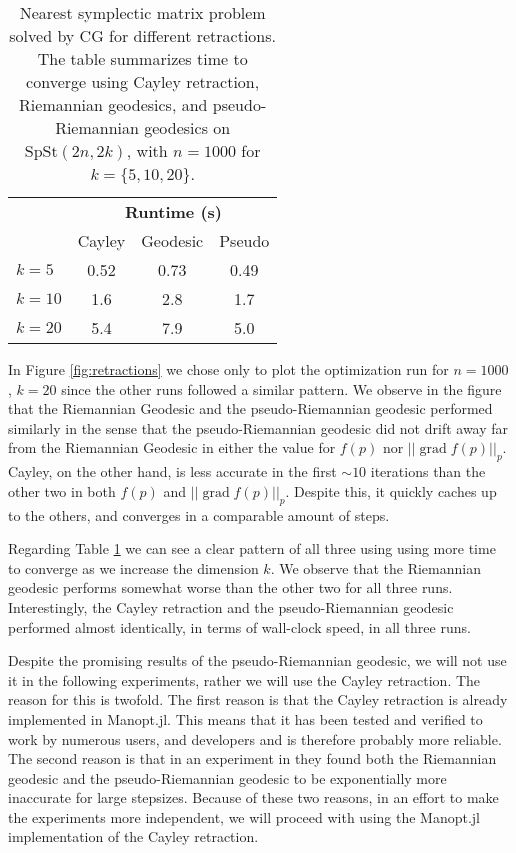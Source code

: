 \begin{table}
    \centering
    \caption[Retraction comparison timetable]{Nearest symplectic matrix problem solved by CG for different retractions. The table summarizes time to converge using Cayley retraction, Riemannian geodesics, and pseudo-Riemannian geodesics on $\mathrm{SpSt}(2n, 2k)$, with $n=1000$ for $k=\{5,10,20\}$. }\label{tab:exp1}
    \begin{tabular}{ l c c c }\label{tbl:Retraction_comparison}
        & \multicolumn{3}{c}{\textbf{Runtime (s)}} \\ 
        \cmidrule(l){2-4}
        & Cayley & Geodesic & Pseudo \\
        \midrule
        $k=5$ & 0.52 & 0.73 & 0.49 \\
        $k=10$ & 1.6 & 2.8 & 1.7 \\
        $k=20$ & 5.4 & 7.9 & 5.0
    \end{tabular}
\end{table}

In Figure \ref{fig:retractions} we chose only to plot the optimization run for $n=1000$, $k=20$ since the other runs followed a similar pattern. We observe in the figure that the Riemannian Geodesic and the pseudo-Riemannian geodesic performed similarly in the sense that the pseudo-Riemannian geodesic did not drift away far from the Riemannian Geodesic in either the value for $f(p)$ nor $\lvert \lvert \operatorname{grad}f(p) \rvert \rvert_{p}$. Cayley, on the other hand, is less accurate in the first $\sim10$ iterations than the other two in both  $f(p)$ and $\lvert \lvert \operatorname{grad}f(p) \rvert \rvert_{p}$. Despite this, it quickly caches up to the others, and converges in a comparable amount of steps. 

Regarding Table \ref{tbl:Retraction_comparison} we can see a clear pattern of all three using using more time to converge as we increase the dimension $k$. We observe that the Riemannian geodesic performs somewhat worse than the other two for all three runs. Interestingly, the Cayley retraction and the pseudo-Riemannian geodesic performed almost identically, in terms of wall-clock speed, in all three runs. 

Despite the promising results of the pseudo-Riemannian geodesic, we will not use it in the following experiments, rather we will use the Cayley retraction. The reason for this is twofold. The first reason is that the Cayley retraction is already implemented in Manopt.jl. This means that it has been tested and verified to work by numerous users, and developers and is therefore probably more reliable. The second reason is that in an experiment in \cite[p.~26]{BendokatZimmermann2021} they found both the Riemannian geodesic and the pseudo-Riemannian geodesic to be exponentially more inaccurate for large stepsizes. Because of these two reasons, in an effort to make the experiments more independent, we will proceed with using the Manopt.jl implementation of the Cayley retraction.